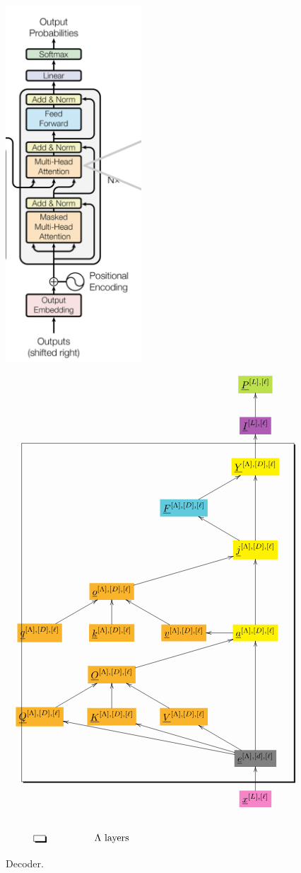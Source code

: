 \documentclass[12pt]{article}
\begin{document}
\begin{figure}[h!]\centering
\begin{minipage}{.5\linewidth}
\includegraphics[width=2in]{decoder.jpg}
\end{minipage}%
\begin{minipage}{.5\linewidth}
$$\xymatrix{
&&&*+[F*:SpringGreen]{\underline{P}^{[L],[\ell]}}
\\
&&&*+[F*:Orchid]{\underline{I}^{[L],[\ell]}}\ar[u]
\\
&&&*+[F*:yellow]{\underline{Y}^{[\Lambda],[D], [\ell]}}\ar[u]
\\
&&*+[F*:SkyBlue]{\underline{F}^{[\Lambda],[D], [\ell]}}\ar[ur]&
\\
&&&*+[F*:yellow]{\underline{j}^{[\Lambda],[D], [\ell]}}\ar[ul]\ar[uu]
\\
&*+[F*:Dandelion]{\underline{o}^{[\Lambda],[D],[\ell]}}\ar[urr]&&
\\
*+[F*:Dandelion]{\underline{q}^{[\Lambda],[D], [\ell]}}\ar[ur]&*+[F*:Dandelion]{\underline{k}^{[\Lambda],[D], [\ell]}}\ar[u]&*+[F*:Dandelion]{\underline{v}^{[\Lambda],[D], [\ell]}}\ar[ul]&*+[F*:yellow]{\underline{a}^{[\Lambda],[D], [\ell]}}\ar[uu]\ar[l]
\\
&*+[F*:Dandelion]{\underline{O}^{[\Lambda],[D],[\ell]}}\ar[urr]&&
\\
*+[F*:Dandelion]{\underline{Q}^{[\Lambda],[D], [\ell]}}\ar[ur]&*+[F*:Dandelion]{\underline{K}^{[\Lambda],[D], [\ell]}}\ar[u]&*+[F*:Dandelion]{\underline{V}^{[\Lambda],[D], [\ell]}}\ar[ul]&
\\
&&&*+[F*:gray]{\underline{e}^{[\Lambda],[d],[\ell]}}\ar[ull]\ar[ulll]\ar[ul]\ar[uuu]
\\
&&&*+[F*:Lavender]{\underline{x}^{[L],[\ell]}}\ar[u]
\save
\POS"3,1"."10,1"."3,4"."10,4"!C*+<3.0em>\frm{-,}
\restore
\\
*+[F-,]{\;\;}&\text{$\Lambda$ layers}
}$$
\end{minipage}
\caption{Decoder.}
\label{fig-texnn-for-decoder}
\end{figure}
\end{document}
